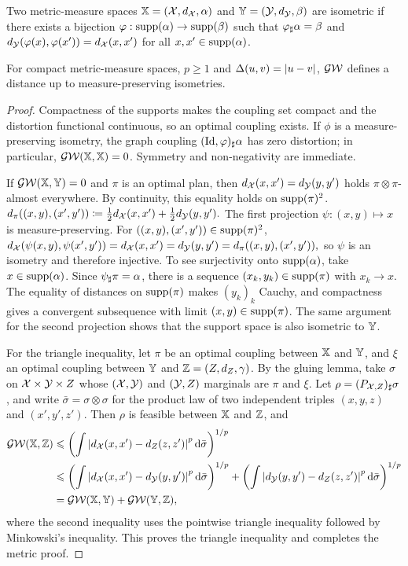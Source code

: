 \begin{defn}\label{def-isometric-mm-spaces}
Two metric-measure spaces $\mathbb{X}=(\mathcal{X},d_{\mathcal{X}},\alpha)$ and $\mathbb{Y}=(\mathcal{Y},d_{\mathcal{Y}},\beta)$ are isometric if there exists a bijection $\varphi:\operatorname{supp}(\alpha)\to\operatorname{supp}(\beta)$ such that $\varphi_\sharp\alpha=\beta$ and
\(d_{\mathcal{Y}}(\varphi(x),\varphi(x'))=d_{\mathcal{X}}(x,x')\)
for all $x,x'\in\operatorname{supp}(\alpha)$.
\end{defn}
\begin{thm}\label{thm-gw-metric}
For compact metric-measure spaces, $p\geq1$ and $\Delta(u,v)=|u-v|$, $\operatorname{\mathcal{GW}}$ defines a distance up to measure-preserving isometries.
\end{thm}
\begin{proof}
Compactness of the supports makes the coupling set compact and the distortion functional continuous, so an optimal coupling exists. If $\phi$ is a measure-preserving isometry, the graph coupling $(\mathrm{Id},\varphi)_\sharp\alpha$ has zero distortion; in particular, $\operatorname{\mathcal{GW}}(\mathbb{X},\mathbb{X})=0$. Symmetry and non-negativity are immediate.

If $\operatorname{\mathcal{GW}}(\mathbb{X},\mathbb{Y})=0$ and $\pi$ is an optimal plan, then $d_{\mathcal{X}}(x,x')=d_{\mathcal{Y}}(y,y')$ holds $\pi\otimes\pi$-almost everywhere. By continuity, this equality holds on $\operatorname{supp}(\pi)^2$.
\(d_\pi((x,y),(x',y')) \coloneqq \frac12d_{\mathcal{X}}(x,x')+\frac12d_{\mathcal{Y}}(y,y').\)
The first projection $\psi:(x,y)\mapsto x$ is measure-preserving. For $((x,y),(x',y'))\in\operatorname{supp}(\pi)^2$, \(d_{\mathcal{X}}(\psi(x,y),\psi(x',y')) = d_{\mathcal{X}}(x,x') = d_{\mathcal{Y}}(y,y') = d_\pi((x,y),(x',y')),\)
so $\psi$ is an isometry and therefore injective. To see surjectivity onto $\operatorname{supp}(\alpha)$, take $x\in\operatorname{supp}(\alpha)$. Since $\psi_\sharp\pi=\alpha$, there is a sequence $(x_k,y_k)\in\operatorname{supp}(\pi)$ with $x_k\to x$. The equality of distances on $\operatorname{supp}(\pi)$ makes $(y_k)_k$ Cauchy, and compactness gives a convergent subsequence with limit $(x,y)\in\operatorname{supp}(\pi)$. The same argument for the second projection shows that the support space is also isometric to $\mathbb{Y}$.

For the triangle inequality, let $\pi$ be an optimal coupling between $\mathbb{X}$ and $\mathbb{Y}$, and $\xi$ an optimal coupling between $\mathbb{Y}$ and $\mathbb{Z}=(Z,d_Z,\gamma)$. By the gluing lemma, take $\sigma$ on $\mathcal{X}\times\mathcal{Y}\times Z$ whose $(\mathcal{X},\mathcal{Y})$ and $(\mathcal{Y},Z)$ marginals are $\pi$ and $\xi$. Let $\rho=(P_{\mathcal{X},Z})_\sharp\sigma$, and write $\bar\sigma=\sigma\otimes\sigma$ for the product law of two independent triples $(x,y,z)$ and $(x',y',z')$. Then $\rho$ is feasible between $\mathbb{X}$ and $\mathbb{Z}$, and
\begin{align*}
\operatorname{\mathcal{GW}}(\mathbb{X},\mathbb{Z})
&\leqslant
\left(
\int
\left\lvert d_{\mathcal{X}}(x,x')-d_Z(z,z')\right\rvert^p
\mathrm{d}\bar\sigma
\right)^{1/p} \\
&\leqslant
\left(
\int
\left\lvert d_{\mathcal{X}}(x,x')-d_{\mathcal{Y}}(y,y')\right\rvert^p
\mathrm{d}\bar\sigma
\right)^{1/p}
+
\left(
\int
\left\lvert d_{\mathcal{Y}}(y,y')-d_Z(z,z')\right\rvert^p
\mathrm{d}\bar\sigma
\right)^{1/p} \\
&=
\operatorname{\mathcal{GW}}(\mathbb{X},\mathbb{Y})+\operatorname{\mathcal{GW}}(\mathbb{Y},\mathbb{Z}),
\end{align*}
where the second inequality uses the pointwise triangle inequality followed by Minkowski's inequality. This proves the triangle inequality and completes the metric proof.
\end{proof}
